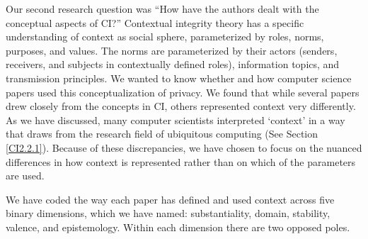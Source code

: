 \documentclass[../thesis.tex]{subfiles}
\begin{document}
Our second research question was ``How have the authors
dealt with the conceptual aspects of CI?'' Contextual
integrity theory has a specific understanding of context as social
sphere, parameterized by roles, norms, purposes, and values. The norms
are parameterized by their actors (senders, receivers, and subjects in
contextually defined roles), information topics, and transmission
principles. We wanted to know whether and how computer science papers
used this conceptualization of privacy. We found that while several
papers drew closely from the concepts in CI, others represented context
very differently. As we have discussed, many computer scientists
interpreted `context' in a way that
draws from the research field of ubiquitous computing (See Section
\ref{CI2.2.1}). Because of these discrepancies, we have chosen to focus on the
nuanced differences in how context is represented rather than on which
of the parameters are used.

We have coded the way each paper has defined and used context across
five binary dimensions, which we have named: substantiality, domain,
stability, valence, and epistemology. Within each dimension there are
two opposed poles.

\bigskip
\end{document}
